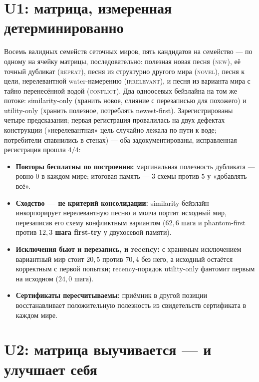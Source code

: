 \documentclass{article}
\begin{document}
\section{U1: матрица, измеренная детерминированно}
\label{sec:u1}

Восемь валидных семейств сеточных миров, пять кандидатов на семейство
--- по одному на ячейку матрицы, последовательно: полезная новая
песня (\textsc{new}), её точный дубликат (\textsc{repeat}), песня из
структурно другого мира (\textsc{novel}), песня к цели, нерелевантной
water-намерению (\textsc{irrelevant}), и песня из варианта мира с
тайно перенесённой водой (\textsc{conflict}). Два одноосевых
бейзлайна на том же потоке: similarity-only (хранить новое, слияние с
перезаписью для похожего) и utility-only (хранить полезное,
потреблять newest-first). Зарегистрированы четыре предсказания;
первая регистрация провалилась на двух дефектах конструкции
(«нерелевантная» цель случайно лежала по пути к воде; потребители
спавнились в стенах) --- оба задокументированы, исправленная
регистрация прошла $4/4$:

\begin{itemize}[leftmargin=16pt,itemsep=2pt,topsep=2pt]
\item \textbf{Повторы бесплатны по построению:} маргинальная
  полезность дубликата --- ровно $0$ в каждом мире; итоговая память
  --- $3$ схемы против $5$ у «добавлять всё».
\item \textbf{Сходство --- не критерий консолидации:}
  similarity-бейзлайн инкорпорирует нерелевантную песню и молча
  портит исходный мир, перезаписав его схему конфликтным вариантом
  ($62{,}6$ шага и phantom-first против \textbf{$12{,}3$ шага
  first-try} у двухосевой памяти).
\item \textbf{Исключения бьют и перезапись, и recency:} с хранимым
  исключением вариантный мир стоит $20{,}5$ против $70{,}4$ без него,
  а исходный остаётся корректным с первой попытки; recency-порядок
  utility-only фантомит первым на исходном ($24{,}0$ шага).
\item \textbf{Сертификаты пересчитываемы:} приёмник в другой позиции
  восстанавливает положительную полезность из свидетельств
  сертификата в каждом мире.
\end{itemize}

\section{U2: матрица выучивается --- и улучшает себя}
\label{sec:u2}
\end{document}
